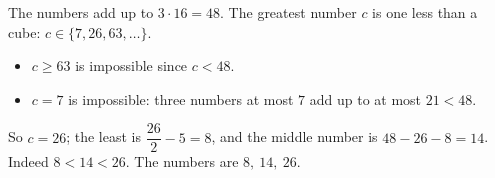 The numbers add up to $3\cdot16=48$. The greatest number $c$ is one less than a cube: $c\in\{7,26,63,\ldots\}$.
\begin{itemize}
\item $c\ge63$ is impossible since $c<48$.
\item $c=7$ is impossible: three numbers at most $7$ add up to at most $21<48$.
\end{itemize}
So $c=26$; the least is $\dfrac{26}{2}-5=8$, and the middle number is $48-26-8=14$. Indeed $8<14<26$. The numbers are $\boxed{8,\ 14,\ 26}$.
